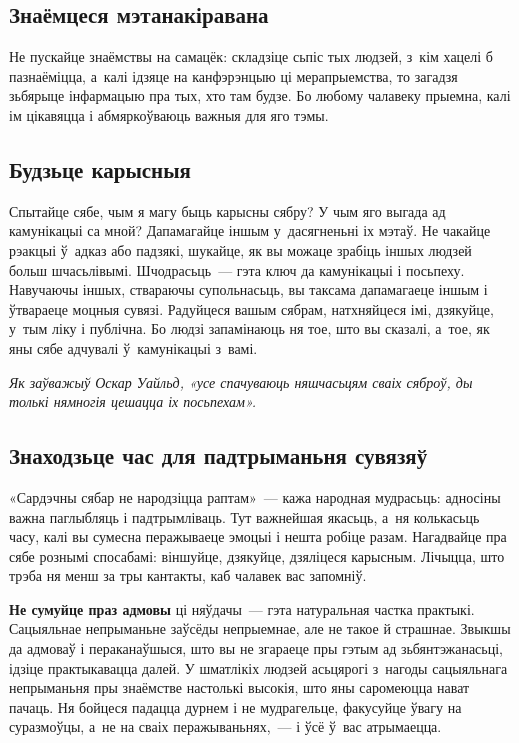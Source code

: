 \subsection*{Знаёмцеся мэтанакіравана}

Не пускайце знаёмствы на самацёк: складзіце сьпіс тых людзей, з~кім хацелі б пазнаёміцца, а~калі ідзяце на канфэрэнцыю ці мерапрыемства, то загадзя зьбярыце інфармацыю пра тых, хто там будзе. Бо любому чалавеку прыемна, калі ім цікавяцца і абмяркоўваюць важныя для яго тэмы.

\subsection*{Будзьце карысныя}

Спытайце сябе, чым я магу быць карысны сябру? У чым яго выгада ад камунікацыі са мной? Дапамагайце іншым у~дасягненьні іх мэтаў. Не чакайце рэакцыі ў~адказ або падзякі, шукайце, як вы можаце зрабіць іншых людзей больш шчасьлівымі. Шчодрасьць~--- гэта ключ да камунікацыі і посьпеху. Навучаючы іншых, ствараючы супольнасьць, вы таксама дапамагаеце іншым і ўтвараеце моцныя сувязі. Радуйцеся вашым сябрам, натхняйцеся імі, дзякуйце, у~тым ліку і публічна. Бо людзі запамінаюць ня тое, што вы сказалі, а~тое, як яны сябе адчувалі ў~камунікацыі з~вамі.

\emph{Як заўважыў Оскар Уайльд, «усе спачуваюць няшчасьцям сваіх сяброў, ды толькі нямногія цешацца іх посьпехам».}

\subsection*{Знаходзьце час для падтрыманьня сувязяў}

«Сардэчны сябар не народзіцца раптам»~--- кажа народная мудрасьць: адносіны важна паглыбляць і падтрымліваць. Тут важнейшая якасьць, а~ня колькасьць часу, калі вы сумесна перажываеце эмоцыі і нешта робіце разам. Нагадвайце пра сябе рознымі спосабамі: віншуйце, дзякуйце, дзяліцеся карысным. Лічыцца, што трэба ня менш за тры кантакты, каб чалавек вас запомніў.

\textbf{Не сумуйце праз адмовы} ці няўдачы~--- гэта натуральная частка практыкі. Сацыяльнае непрыманьне заўсёды непрыемнае, але не такое й страшнае. Звыкшы да адмоваў і пераканаўшыся, што вы не згараеце пры гэтым ад зьбянтэжанасьці, ідзіце практыкавацца далей. У шматлікіх людзей асьцярогі з~нагоды сацыяльнага непрыманьня пры знаёмстве настолькі высокія, што яны саромеюцца нават пачаць. Ня бойцеся падацца дурнем і не мудрагельце, факусуйце ўвагу на суразмоўцы, а~не на сваіх перажываньнях,~--- і ўсё ў~вас атрымаецца.

